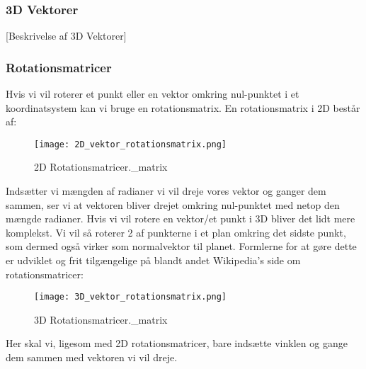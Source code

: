 \subsubsection{3D Vektorer}

[Beskrivelse af 3D Vektorer]


\subsubsection{Rotationsmatricer}
Hvis vi vil roterer et punkt eller en vektor omkring nul-punktet i et koordinatsystem kan vi bruge en rotationsmatrix\cite{rotationsmatricer}. En rotationsmatrix i 2D består af:
\begin{figure}[H]
  \centering
  \texttt{[image: 2D\_vektor\_rotationsmatrix.png]}
  \caption{2D Rotationsmatricer.\_matrix}
\end{figure}



Indsætter vi mængden af radianer vi vil dreje vores vektor og ganger dem sammen, ser vi at vektoren bliver drejet omkring nul-punktet med netop den mængde radianer. 
Hvis vi vil rotere en vektor/et punkt i 3D bliver det lidt mere komplekst. Vi vil så roterer 2 af punkterne i et plan omkring det sidste punkt, som dermed også virker som normalvektor til planet. Formlerne for at gøre dette er udviklet og frit tilgængelige på blandt andet Wikipedia's side om rotationsmatricer:
\begin{figure}[H]
  \centering
  \texttt{[image: 3D\_vektor\_rotationsmatrix.png]}
  \caption{3D Rotationsmatricer.\_matrix}
\end{figure}
Her skal vi, ligesom med 2D rotationsmatricer, bare indsætte vinklen og gange dem sammen med vektoren vi vil dreje.